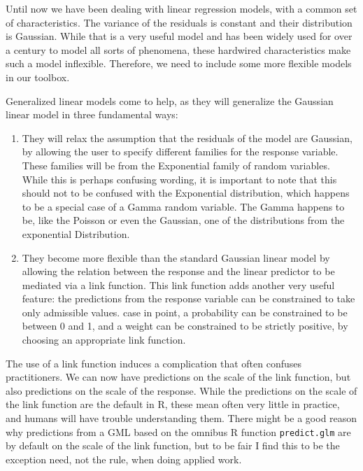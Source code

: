 \documentclass[
]{book}
\begin{document}
Until now we have been dealing with linear regression models, with a common set of characteristics. The variance of the residuals is constant and their distribution is Gaussian. While that is a very useful model and has been widely used for over a century to model all sorts of phenomena, these hardwired characteristics make such a model inflexible. Therefore, we need to include some more flexible models in our toolbox.

Generalized linear models come to help, as they will generalize the Gaussian linear model in three fundamental ways:

\begin{enumerate}
\def\labelenumi{\arabic{enumi}.}
\item
  They will relax the assumption that the residuals of the model are Gaussian, by allowing the user to specify different families for the response variable. These families will be from the Exponential family of random variables. While this is perhaps confusing wording, it is important to note that this should not to be confused with the Exponential distribution, which happens to be a special case of a Gamma random variable. The Gamma happens to be, like the Poisson or even the Gaussian, one of the distributions from the exponential Distribution.
\item
  They become more flexible than the standard Gaussian linear model by allowing the relation between the response and the linear predictor to be mediated via a link function. This link function adds another very useful feature: the predictions from the response variable can be constrained to take only admissible values. case in point, a probability can be constrained to be between 0 and 1, and a weight can be constrained to be strictly positive, by choosing an appropriate link function.
\end{enumerate}

The use of a link function induces a complication that often confuses practitioners. We can now have predictions on the scale of the link function, but also predictions on the scale of the response. While the predictions on the scale of the link function are the default in R, these mean often very little in practice, and humans will have trouble understanding them. There might be a good reason why predictions from a GML based on the omnibus R function \texttt{predict.glm} are by default on the scale of the link function, but to be fair I find this to be the exception need, not the rule, when doing applied work.
\end{document}
